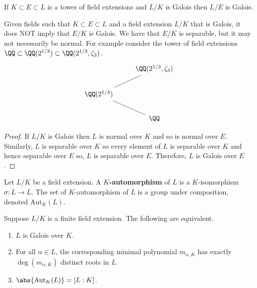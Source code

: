 \documentclass[12pt, a4paper]{article}
\newcommand{\aut}{\text{Aut}}
\begin{document}
\begin{mdprop}
    If \(K \subset E \subset L\) is a tower of field extensions and \(L/K\) is Galois then \(L/E\) is Galois.
\end{mdprop}

\begin{mdremark}
    Given fields such that \(K \subset E \subset L\) and a field extension \(L/K\) that is Galois, it does NOT imply that \(E/K\) is Galois. We have that \(E/K\) is separable, but it may not necessarily be normal. For example consider the tower of field extensions \(\QQ \subset \QQ(2^{1/3}) \subset \QQ(2^{1/3},\zeta_3)\).
    \[\begin{tikzcd}
        & {\QQ(2^{1/3},\zeta_3)} \\
        {\QQ(2^{1/3})} \\
        & \QQ
        \arrow[no head, from=3-2, to=2-1]
        \arrow[no head, from=2-1, to=1-2]
    \end{tikzcd}\]
\end{mdremark}

\begin{proof}
    If \(L/K\) is Galois then \(L\) is normal over \(K\) and so is normal over \(E\). Similarly, \(L\) is separable over \(K\) so every element of \(L\) is separable over \(K\) and hence separable over \(E\) so, \(L\) is separable over \(E\). Therefore, \(L\) is Galois over \(E\).
\end{proof}

\begin{definition}
    Let \(L/K\) be a field extension. A \textbf{\(K\)-automorphism} of \(L\) is a \(K\)-isomorphism \(\sigma:L \to L\). The set of \(K\)-automorphism of \(L\) is a group under composition, denoted \(\aut_K(L)\).
\end{definition}

\begin{mdprop}
    Suppose \(L/K\) is a finite field extension. The following are equivalent.
    \begin{enumerate}
        \item \(L\) is Galois over \(K\).
        \item For all \(\alpha \in L\), the corresponding minimal polynomial \(m_{\alpha,K}\) has exactly \(\deg(m_{\alpha,K})\) distinct roots in \(L\).
        \item \(\abs{\aut_K(L)}=[L:K]\).
    \end{enumerate}
\end{mdprop}
\end{document}
